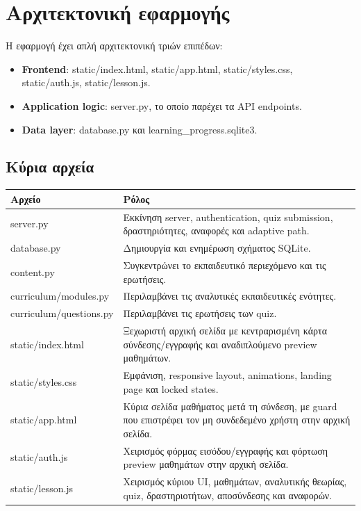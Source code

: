 \documentclass[a4paper]{article}
\newcommand{\textlatin}[1]{\textenglish{#1}}
\begin{document}
\section{Αρχιτεκτονική εφαρμογής}

Η εφαρμογή έχει απλή αρχιτεκτονική τριών επιπέδων:

\begin{itemize}[leftmargin=1.2cm]
  \item \textbf{Frontend}: \textlatin{static/index.html}, \textlatin{static/app.html}, \textlatin{static/styles.css}, \textlatin{static/auth.js}, \textlatin{static/lesson.js}.
  \item \textbf{Application logic}: \textlatin{server.py}, το οποίο παρέχει τα \textlatin{API endpoints}.
  \item \textbf{Data layer}: \textlatin{database.py} και \textlatin{learning\_progress.sqlite3}.
\end{itemize}

\subsection{Κύρια αρχεία}

\begin{longtable}{|p{5cm}|p{9cm}|}
\hline
\textbf{Αρχείο} & \textbf{Ρόλος} \\
\hline
\textlatin{server.py} & Εκκίνηση server, authentication, quiz submission, δραστηριότητες, αναφορές και adaptive path. \\
\hline
\textlatin{database.py} & Δημιουργία και ενημέρωση σχήματος SQLite. \\
\hline
\textlatin{content.py} & Συγκεντρώνει το εκπαιδευτικό περιεχόμενο και τις ερωτήσεις. \\
\hline
\textlatin{curriculum/modules.py} & Περιλαμβάνει τις αναλυτικές εκπαιδευτικές ενότητες. \\
\hline
\textlatin{curriculum/questions.py} & Περιλαμβάνει τις ερωτήσεις των quiz. \\
\hline
\textlatin{static/index.html} & Ξεχωριστή αρχική σελίδα με κεντραρισμένη κάρτα σύνδεσης/εγγραφής και αναδιπλούμενο preview μαθημάτων. \\
\hline
\textlatin{static/styles.css} & Εμφάνιση, responsive layout, animations, landing page και locked states. \\
\hline
\textlatin{static/app.html} & Κύρια σελίδα μαθήματος μετά τη σύνδεση, με guard που επιστρέφει τον μη συνδεδεμένο χρήστη στην αρχική σελίδα. \\
\hline
\textlatin{static/auth.js} & Χειρισμός φόρμας εισόδου/εγγραφής και φόρτωση preview μαθημάτων στην αρχική σελίδα. \\
\hline
\textlatin{static/lesson.js} & Χειρισμός κύριου UI, μαθημάτων, αναλυτικής θεωρίας, quiz, δραστηριοτήτων, αποσύνδεσης και αναφορών. \\
\hline
\end{longtable}
\end{document}
